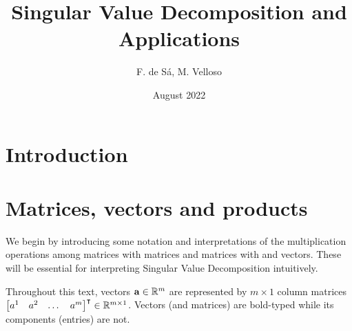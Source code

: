 \documentclass{article}
\title{Singular Value Decomposition and Applications}
\author{F. de Sá, M. Velloso}
\date{August 2022}
\begin{document}
\maketitle

\section{Introduction}
\section{Matrices, vectors and products}

We begin by introducing some notation and interpretations of the multiplication operations among matrices with matrices and matrices with and vectors. These will be essential for interpreting Singular Value Decomposition intuitively.

Throughout this text, vectors $\vb{a}\in\mathbb{R}^m$ are represented by $m\times 1$ column matrices $\mqty[a^1 & a^2 & \dots & a^m]^{\intercal}\in\mathbb{R}^{m \times 1} $. Vectors (and matrices) are bold-typed while its components (entries) are not.
\end{document}
